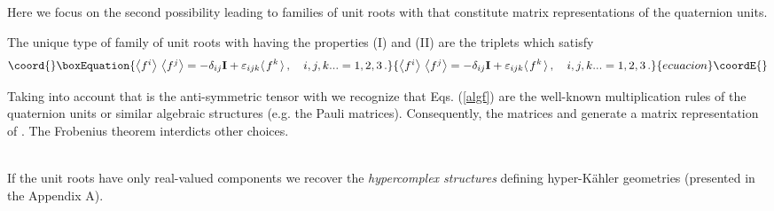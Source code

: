 \documentclass[a4paper,12pt]{article}
\begin{document}
Here we focus on the second possibility leading to families of unit roots with 
\coordHE{} that constitute matrix representations of the quaternion units. 
\begin{theor}\label{bumbum}
The unique type of family of unit roots with \coordHE{} having the properties (I) 
and (II) are the triplets \coordHE{} which 
satisfy 
\begin{equation}\coord{}\boxEquation{\label{algf}
{{\textstyle  \left<f^i\right>\,\left<f^j\right>}=-\delta_{ij} {\bf  I}} +
\varepsilon_{ijk} {\textstyle  
\left< \right.} f^k {\left. \textstyle \right>}\,, 
\quad i,j,k...=1,2,3\,. 
}{{{\textstyle  \left<f^i\right>\,\left<f^j\right>}=-\delta_{ij} {\bf  I}} +
\varepsilon_{ijk} {\textstyle  
\left< \right.} f^k {\left. \textstyle \right>}\,, 
\quad i,j,k...=1,2,3\,. 
}{ecuacion}\coordE{}\end{equation}
\end{theor}
\begin{demo}
Taking into account that \coordHE{} is the anti-symmetric tensor 
with \coordHE{} we recognize that Eqs. (\ref{algf}) are the 
well-known multiplication rules of the quaternion units or similar algebraic 
structures (e.g. the Pauli matrices). Consequently, the matrices  
\coordHE{} and \coordHE{} generate a matrix representation of 
\coordHE{}. The Frobenius theorem interdicts other choices.
\end{demo}\\
If the unit roots \coordHE{} have only real-valued components 
we recover the {\em hypercomplex structures} defining hyper-K\" ahler 
geometries (presented in the Appendix A). 
\end{document}
